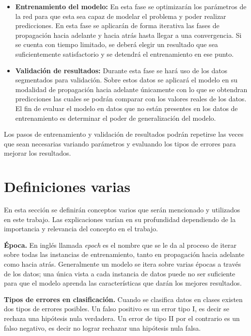 \begin{itemize}
\item \textbf{Entrenamiento del modelo:} En esta fase se optimizarán los parámetros de la red para que esta sea capaz de modelar el problema y poder realizar predicciones. En esta fase se aplicarán de forma iterativa las fases de propagación hacia adelante y hacia atrás hasta llegar a una convergencia. Si se cuenta con tiempo limitado, se deberá elegir un resultado que sea suficientemente satisfactorio y se detendrá el entrenamiento en ese punto.

\item \textbf{Validación de resultados:} Durante esta fase se hará uso de los datos segmentados para validación. Sobre estos datos se aplicará el modelo en su modalidad de propagación hacia adelante únicamente con lo que se obtendran predicciones las cuales se podrán comparar con los valores reales de los datos. El fin de evaluar el modelo en datos que no están presentes en los datos de entrenamiento es determinar el poder de generalización del modelo.

\end{itemize}

Los pasos de entrenamiento y validación de resultados podrán repetirse las veces que sean necesarias variando parámetros y evaluando los tipos de errores para mejorar los resultados.

\section{Definiciones varias}

En esta sección se definirán conceptos varios que serán mencionado y utilizados en este trabajo. Las explicaciones varían en su profundidad dependiendo de la importancia y relevancia del concepto en el trabajo.

\textbf{Época.} En inglés llamada \emph{epoch} es el nombre que se le da al proceso de iterar sobre todas las instancias de entrenamiento, tanto en propagación hacia adelante como hacia atrás. Generalmente un modelo se itera sobre varias épocas a través de los datos; una única vista a cada instancia de datos puede no ser suficiente para que el modelo aprenda las características que darán los mejores resultados.

\textbf{Tipos de errores en clasificación.} Cuando se clasifica datos en clases existen dos tipos de errores posibles. Un falso positivo es un error tipo I, es decir se rechaza una hipótesis nula verdadera. Un error de tipo II por el contrario es un falso negativo, es decir no lograr rechazar una hipótesis nula falsa.

